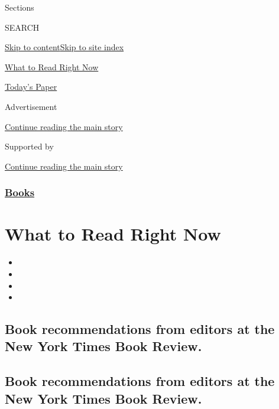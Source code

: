 Sections

SEARCH

\protect\hyperlink{site-content}{Skip to
content}\protect\hyperlink{site-index}{Skip to site index}

\href{https://www.nytimes.com/spotlight/books-to-read}{What to Read
Right Now}

\href{https://myaccount.nytimes.com/auth/login?response_type=cookie\&client_id=vi}{}

\href{https://www.nytimes.com/section/todayspaper}{Today's Paper}

Advertisement

\protect\hyperlink{after-top}{Continue reading the main story}

Supported by

\protect\hyperlink{after-sponsor}{Continue reading the main story}

\hypertarget{books}{%
\subsubsection{\texorpdfstring{\href{/section/books}{Books}}{Books}}\label{books}}

\hypertarget{what-to-read-right-now}{%
\section{What to Read Right Now}\label{what-to-read-right-now}}

\begin{itemize}
\item
\item
\item
\item
\end{itemize}

\hypertarget{book-recommendations-from-editors-at-the-new-york-times-book-review}{%
\subsection{Book recommendations from editors at the New York Times Book
Review.}\label{book-recommendations-from-editors-at-the-new-york-times-book-review}}

\hypertarget{book-recommendations-from-editors-at-the-new-york-times-book-review-1}{%
\subsection{Book recommendations from editors at the New York Times Book
Review.}\label{book-recommendations-from-editors-at-the-new-york-times-book-review-1}}

